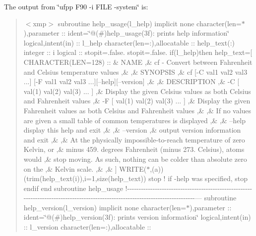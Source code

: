 The output from \char`\"{}ufpp F90 -\/i F\+I\+L\+E -\/system\char`\"{} is\+: \begin{quote}
$<$xmp$>$ subroutine help\+\_\+usage(l\+\_\+help) implicit none character(len=$\ast$),parameter \+:\+: ident=\char`\"{}@(\#)help\+\_\+usage(3f)\+: prints help information\char`\"{} logical,intent(in) \+:\+: l\+\_\+help character(len=\+:),allocatable \+:\+: help\+\_\+text(\+:) integer \+:\+: i logical \+:\+: stopit=.false. stopit=.false. if(l\+\_\+help)then help\+\_\+text=\mbox{[} C\+H\+A\+R\+A\+C\+T\+ER(L\+EN=128) \+:\+: \& \textquotesingle{}N\+A\+ME \textquotesingle{},\& \textquotesingle{} cf -\/ Convert between Fahrenheit and Celsius temperature values \textquotesingle{},\& \textquotesingle{} \textquotesingle{},\& \textquotesingle{}S\+Y\+N\+O\+P\+S\+IS \textquotesingle{},\& \textquotesingle{} cf \mbox{[}-\/C val1 val2 val3 ...\mbox{]} \mbox{[}-\/F val1 val2 val3 ...\mbox{]}\mbox{[}--help\mbox{]}\mbox{[}--version\mbox{]} \textquotesingle{},\& \textquotesingle{} \textquotesingle{},\& \textquotesingle{}D\+E\+S\+C\+R\+I\+P\+T\+I\+ON \textquotesingle{},\& \textquotesingle{} -\/C \mbox{[} val(1) val(2) val(3) ... \mbox{]} \textquotesingle{},\& \textquotesingle{} Display the given Celsius values as both Celsius and Fahrenheit values \textquotesingle{},\& \textquotesingle{} -\/F \mbox{[} val(1) val(2) val(3) ... \mbox{]} \textquotesingle{},\& \textquotesingle{} Display the given Fahrenheit values as both Celsius and Fahrenheit values \textquotesingle{},\& \textquotesingle{} \textquotesingle{},\& \textquotesingle{} If no values are given a small table of common temperatures is displayed \textquotesingle{},\& \textquotesingle{} \textquotesingle{},\& \textquotesingle{} --help display this help and exit \textquotesingle{},\& \textquotesingle{} \textquotesingle{},\& \textquotesingle{} --version \textquotesingle{},\& \textquotesingle{} output version information and exit \textquotesingle{},\& \textquotesingle{} \textquotesingle{},\& \textquotesingle{} At the physically impossible-\/to-\/reach temperature of zero Kelvin, or \textquotesingle{},\& \textquotesingle{} minus 459. degrees Fahrenheit (minus 273. Celsius), atoms would \textquotesingle{},\& \textquotesingle{} stop moving. As such, nothing can be colder than absolute zero on the \textquotesingle{},\& \textquotesingle{} Kelvin scale. \textquotesingle{},\& \textquotesingle{} \textquotesingle{},\& \textquotesingle{}\textquotesingle{}\mbox{]} W\+R\+I\+TE($\ast$,\textquotesingle{}(a)\textquotesingle{})(trim(help\+\_\+text(i)),i=1,size(help\+\_\+text)) stop ! if -\/help was specified, stop endif end subroutine help\+\_\+usage !-\/-\/-\/-\/-\/-\/-\/-\/-\/-\/-\/-\/-\/-\/-\/-\/-\/-\/-\/-\/-\/-\/-\/-\/-\/-\/-\/-\/-\/-\/-\/-\/-\/-\/-\/-\/-\/-\/-\/-\/-\/-\/-\/-\/-\/-\/-\/-\/-\/-\/-\/-\/-\/-\/-\/-\/-\/-\/-\/-\/-\/-\/-\/-\/-\/-\/-\/-\/-\/-\/-\/-\/-\/-\/-\/-\/-\/-\/-\/-\/-\/-\/-\/-\/-\/-\/-\/-\/-\/-\/-\/-\/-\/-\/-\/-\/-\/-\/-\/-\/-\/-\/-\/-\/-\/-\/-\/-\/-\/-\/-\/-\/-\/-\/-\/-\/-\/-\/-\/-\/-\/-\/-\/-\/-\/-\/-\/-\/--- subroutine help\+\_\+version(l\+\_\+version) implicit none character(len=$\ast$),parameter \+:\+: ident=\char`\"{}@(\#)help\+\_\+version(3f)\+: prints version information\char`\"{} logical,intent(in) \+:\+: l\+\_\+version character(len=\+:),allocatable \+:\+: 
\end{quote}
